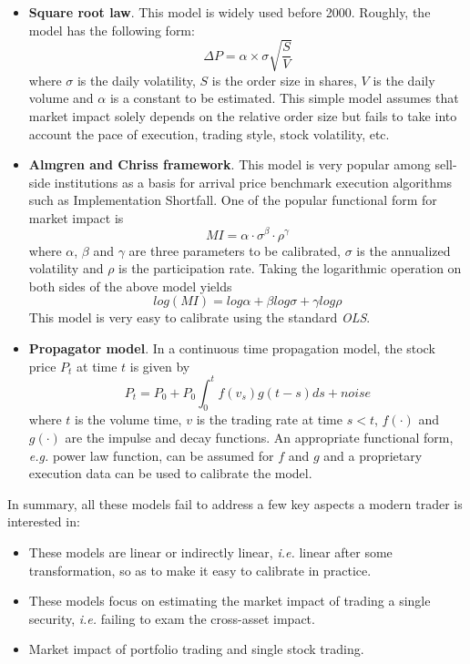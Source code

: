 \documentclass[a4paper]{article}
\begin{document}
\begin{itemize}
\item \textbf{Square root law}. This model is widely used before 2000. Roughly, the model has the following form: $$\Delta P = \alpha \times \sigma \sqrt{\frac{S}{V}}$$ where $\sigma$ is the daily volatility, $S$ is the order size in shares, $V$ is the daily volume and $\alpha$ is a constant to be estimated. This simple model assumes that market impact solely depends on the relative order size but fails to take into account the pace of execution, trading style, stock volatility, etc.
\item \textbf{Almgren and Chriss framework}. This model is very popular among sell-side institutions as a basis for arrival price benchmark execution algorithms such as Implementation Shortfall. One of the popular functional form for market impact is $$MI = \alpha \cdot \sigma ^{\beta} \cdot \rho^{\gamma}$$ where $\alpha$, $\beta$ and $\gamma$ are three parameters to be calibrated, $\sigma$ is the annualized volatility and $\rho$ is the participation rate. Taking the logarithmic operation on both sides of the above model yields $$log(MI) = log\alpha + \beta log\sigma + \gamma log\rho$$ This model is very easy to calibrate using the standard \emph{OLS}. 
\item \textbf{Propagator model}. In a continuous time propagation model, the stock price $P_t$ at time $t$ is given by $$P_t = P_0 + P_0\int_{0}^t f(v_s)g(t-s)ds + noise$$ where $t$ is the volume time, $v$ is the trading rate at time $s<t$, $f(\cdot)$ and $g(\cdot)$ are the impulse and decay functions. An appropriate functional form, \emph{e.g.} power law function, can be assumed for $f$ and $g$ and a proprietary execution data can be used to calibrate the model.
\end{itemize}

In summary, all these models fail to address a few key aspects a modern trader is interested in:
\begin{itemize}
\item These models are linear or indirectly linear, \emph{i.e.} linear after some transformation, so as to make it easy to calibrate in practice.
\item These models focus on estimating the market impact of trading a single security, \emph{i.e.} failing to exam the cross-asset impact.
\item Market impact of portfolio trading and single stock trading.
\end{itemize}
\end{document}
